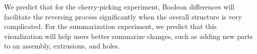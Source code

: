 \documentclass[sigconf,authorversion,nonacm]{acmart}
\begin{document}
We predict that for the cherry-picking experiment, Boolean differences will facilitate the reversing process significantly when the overall structure is very complicated. For the summarization experiment, we predict that this visualization will help users better summarize changes, such as adding new parts to an assembly, extrusions, and holes.%







\end{document}
